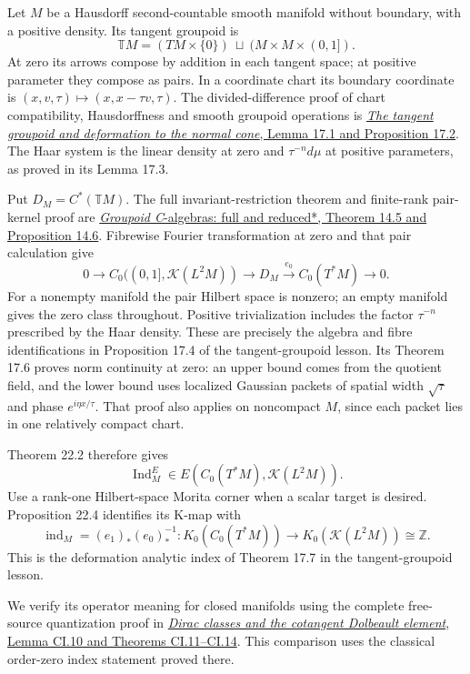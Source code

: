 \documentclass[
  11pt,
]{article}
\begin{document}
Let \(M\) be a Hausdorff second-countable smooth manifold without
boundary, with a positive density. Its tangent groupoid is \[
\mathbb T M=(TM\times\{0\})\ \sqcup\
(M\times M\times(0,1]).
\tag{22.11}
\] At zero its arrows compose by addition in each tangent space; at
positive parameter they compose as pairs. In a coordinate chart its
boundary coordinate is \((x,v,\tau)\mapsto(x,x-\tau v,\tau)\). The
divided-difference proof of chart compatibility, Hausdorffness and
smooth groupoid operations is \href{../KT-CP/KT-CP-17.html}{\emph{The
tangent groupoid and deformation to the normal cone}, Lemma 17.1 and
Proposition 17.2}. The Haar system is the linear density at zero and
\(\tau^{-n}d\mu\) at positive parameters, as proved in its Lemma 17.3.

Put \(D_M=C^*(\mathbb T M)\). The full invariant-restriction theorem and
finite-rank pair-kernel proof are
\href{../KT-CP/KT-CP-14.html}{\emph{Groupoid C}-algebras: full and
reduced*, Theorem 14.5 and Proposition 14.6}. Fibrewise Fourier
transformation at zero and that pair calculation give \[
0\longrightarrow C_0((0,1],\mathcal K(L^2M))
\longrightarrow D_M\xrightarrow{e_0}C_0(T^*M)
\longrightarrow0.
\tag{22.12}
\] For a nonempty manifold the pair Hilbert space is nonzero; an empty
manifold gives the zero class throughout. Positive trivialization
includes the factor \(\tau^{-n}\) prescribed by the Haar density. These
are precisely the algebra and fibre identifications in Proposition 17.4
of the tangent-groupoid lesson. Its Theorem 17.6 proves norm continuity
at zero: an upper bound comes from the quotient field, and the lower
bound uses localized Gaussian packets of spatial width \(\sqrt{\tau}\)
and phase \(e^{i\eta x/\tau}\). That proof also applies on noncompact
\(M\), since each packet lies in one relatively compact chart.

Theorem 22.2 therefore gives \[
\operatorname{Ind}^{E}_M\in
E(C_0(T^*M),\mathcal K(L^2M)).
\tag{22.13}
\] Use a rank-one Hilbert-space Morita corner when a scalar target is
desired. Proposition 22.4 identifies its K-map with \[
\operatorname{ind}_M=(e_1)_*(e_0)_*^{-1}:
K_0(C_0(T^*M))\longrightarrow K_0(\mathcal K(L^2M))
\cong\mathbb Z.
\tag{22.14}
\] This is the deformation analytic index of Theorem 17.7 in the
tangent-groupoid lesson.

We verify its operator meaning for closed manifolds using the complete
free-source quantization proof in
\href{KT-KK-15.html\#9-a-universal-quantization-morphism}{\emph{Dirac
classes and the cotangent Dolbeault element}, Lemma CI.10 and Theorems
CI.11--CI.14}. This comparison uses the classical order-zero index
statement proved there.
\end{document}

